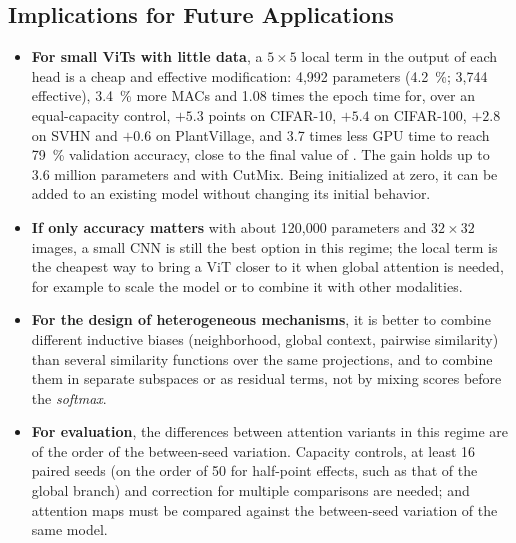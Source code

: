 \subsection{Implications for Future Applications}
\label{sec:implicaciones}
\begin{itemize}
  \item \textbf{For small ViTs with little data}, a $5\times5$ local term in the output of each head is a cheap and effective modification: 4,992 parameters (4.2~\%; 3,744 effective), 3.4~\% more MACs and 1.08 times the epoch time for, over an equal-capacity control, $+5.3$ points on CIFAR-10, $+5.4$ on CIFAR-100, $+2.8$ on SVHN and $+0.6$ on PlantVillage, and 3.7 times less GPU time to reach 79~\% validation accuracy, close to the final value of . The gain holds up to 3.6 million parameters and with CutMix. Being initialized at zero, it can be added to an existing model without changing its initial behavior.
  \item \textbf{If only accuracy matters} with about 120,000 parameters and $32\times32$ images, a small CNN is still the best option in this regime; the local term is the cheapest way to bring a ViT closer to it when global attention is needed, for example to scale the model or to combine it with other modalities.
  \item \textbf{For the design of heterogeneous mechanisms}, it is better to combine different inductive biases (neighborhood, global context, pairwise similarity) than several similarity functions over the same projections, and to combine them in separate subspaces or as residual terms, not by mixing scores before the \emph{softmax}.
  \item \textbf{For evaluation}, the differences between attention variants in this regime are of the order of the between-seed variation. Capacity controls, at least 16 paired seeds (on the order of 50 for half-point effects, such as that of the global branch) and correction for multiple comparisons are needed; and attention maps must be compared against the between-seed variation of the same model.
\end{itemize}


